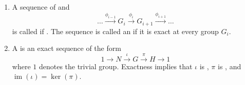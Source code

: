 \begin{definition} \label{definition:exact_sequence_short_exact_sequence_of_group_homomorphisms}
    \begin{enumerate}
        \item 
        A sequence of  and 
        $$ \dots \xrightarrow{\phi_{i-1}} G_i \xrightarrow{\phi_i} G_{i+1} \xrightarrow{\phi_{i+1}} \dots $$
        is called  if . The sequence is called an  if it is exact at every group $G_i$.

        \item A  is an exact sequence of the form
        $$ 1 \longrightarrow N \xrightarrow{\iota} G \xrightarrow{\pi} H \longrightarrow 1 $$
        where $1$ denotes the trivial group. Exactness implies that $\iota$ is , $\pi$ is , and $\operatorname{im}(\iota) = \operatorname{ker}(\pi)$.
    \end{enumerate}
\end{definition}